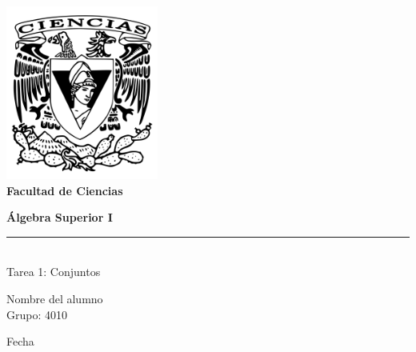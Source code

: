 
\begin{titlepage} %

    \begin{flushleft}

	   \includegraphics[width=50mm,scale=0.5]{img/fciencias.png}%
	   \large \textbf{\\Facultad de Ciencias}

	   \vspace{2.5cm} %

	   \large \textbf{\'Algebra Superior I}\\%
	   \rule{5cm}{3pt} %
	   \large{\\Tarea 1: Conjuntos} %

	   \vspace{2.5cm} %

	   Nombre del alumno\\ %
	   Grupo: 4010 %

	   \vspace{2.5cm} %

	   Fecha

    \end{flushleft}

\end{titlepage}